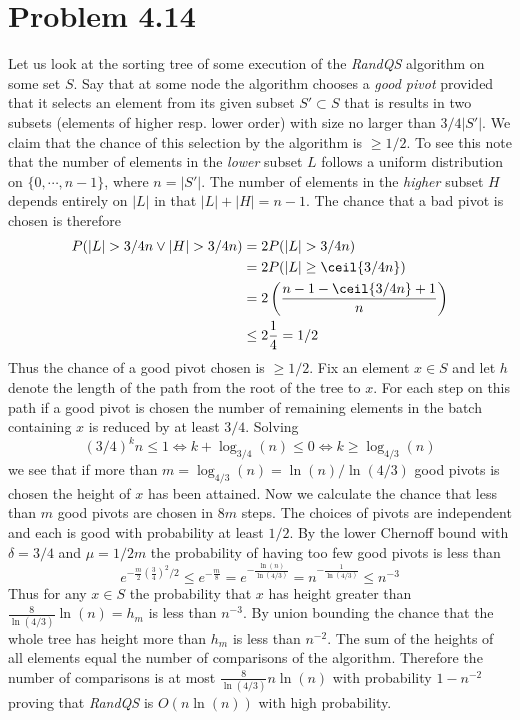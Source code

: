 \section*{Problem 4.14}

Let us look at the sorting tree of some execution of the \emph{RandQS} algorithm on some set $S$.
Say that at some node the algorithm chooses a \emph{good pivot} provided that it selects an element from its given subset $S' \subset S$ that is results in two subsets (elements of higher resp. lower order) with size no larger than $3/4 |S'|$.
We claim that the chance of this selection by the algorithm is $\geq 1/2$.
To see this note that the number of elements in the \emph{lower} subset $L$ follows a uniform distribution on $\{0,\cdots,n-1\}$, where $n = |S'|$.
The number of elements in the \emph{higher} subset $H$ depends entirely on $|L|$ in that $|L| + |H| = n-1$.
The chance that a bad pivot is chosen is therefore
\begin{align*}
  P(|L|>3/4 n \lor |H|>3/4 n) &= 2 P(|L|>3/4 n)
  \\ &= 2 P(|L| \geq \ceil{3/4 n})
  \\ &= 2 \left(\frac{n-1 - \ceil{3/4 n} + 1}{n} \right)
  \\ &\leq 2 \frac{1}{4} = 1/2
\end{align*}
Thus the chance of a good pivot chosen is $\geq 1/2$.
Fix an element $x \in S$ and let $h$ denote the length of the path from the root of the tree to $x$.
For each step on this path if a good pivot is chosen the number of remaining elements in the batch containing $x$ is reduced by at least $3/4$.
Solving
\[(3/4)^k n \leq 1 \iff k + \log_{3/4}(n) \leq 0 \iff k \geq \log_{4/3}(n) \]
we see that if more than $m = \log_{4/3}(n) = \ln(n) / \ln(4/3) $ good pivots is chosen the height of $x$ has been attained.
Now we calculate the chance that less than $m$ good pivots are chosen in $8 m$ steps.
The choices of pivots are independent and each is good with probability at least $1/2$.
By the lower Chernoff bound with $\delta = 3/4$ and $\mu = 1/2 m$ the probability of having too few good pivots is less than 
\[ e^{-\frac{m}{2} \left(\frac{3}{4}\right)^2 / 2} \leq e^{-\frac{m}{8}} = e^{-\frac{\ln(n)}{\ln(4/3)}} = n^{-\frac{1}{\ln(4/3)}} \leq n^{-3} \] 
Thus for any $x \in S$ the probability that $x$ has height greater than $\frac{8}{\ln(4/3)} \ln(n) = h_m$ is less than $n^{-3}$.
By union bounding the chance that the whole tree has height more than $h_m$ is less than $n^{-2}$. 
The sum of the heights of all elements equal the number of comparisons of the algorithm.
Therefore the number of comparisons is at most $\frac{8}{\ln(4/3)} n \ln(n)$ with probability $1 - n^{-2}$ proving that \emph{RandQS} is $O(n \ln(n))$ with high probability. 
